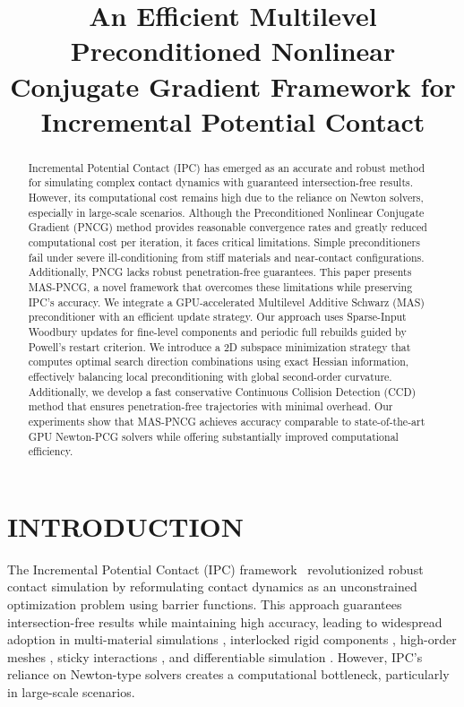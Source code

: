 \documentclass[acmtog,anonymous,review,screen,nonacm]{acmart}
\begin{document}
\title[MAS-PNCG]{An Efficient Multilevel Preconditioned Nonlinear Conjugate Gradient Framework for Incremental Potential Contact}
\begin{abstract} 
Incremental Potential Contact (IPC) has emerged as an accurate and robust method for simulating complex contact dynamics with guaranteed intersection-free results. However, its computational cost remains high due to the reliance on Newton solvers, especially in large-scale scenarios.
Although the Preconditioned Nonlinear Conjugate Gradient (PNCG) method provides reasonable convergence rates and greatly reduced computational cost per iteration, it faces critical limitations. Simple preconditioners fail under severe ill-conditioning from stiff materials and near-contact configurations. Additionally, PNCG lacks robust penetration-free guarantees.
This paper presents MAS-PNCG, a novel framework that overcomes these limitations while preserving IPC's accuracy. We integrate a GPU-accelerated Multilevel Additive Schwarz (MAS) preconditioner with an efficient update strategy. Our approach uses Sparse-Input Woodbury updates for fine-level components and periodic full rebuilds guided by Powell's restart criterion. We introduce a 2D subspace minimization strategy that computes optimal search direction combinations using exact Hessian information, effectively balancing local preconditioning with global second-order curvature.
Additionally, we develop a fast conservative Continuous Collision Detection (CCD) method that ensures penetration-free trajectories with minimal overhead. Our experiments show that MAS-PNCG achieves accuracy comparable to state-of-the-art GPU Newton-PCG solvers while offering substantially improved computational efficiency. 
\end{abstract}


\maketitle

\section{INTRODUCTION}
The Incremental Potential Contact (IPC) framework~\cite{li2020incremental} revolutionized robust contact simulation by reformulating contact dynamics as an unconstrained optimization problem using barrier functions. This approach guarantees intersection-free results while maintaining high accuracy, leading to widespread adoption in multi-material simulations \cite{li2024dynamic,xie2023contact}, interlocked rigid components \cite{tang2023beyond}, high-order meshes \cite{ferguson2023high}, sticky interactions \cite{fang2023augmented}, and differentiable simulation \cite{huang2024differentiable}. However, IPC's reliance on Newton-type solvers creates a computational bottleneck, particularly in large-scale scenarios.
\end{document}
